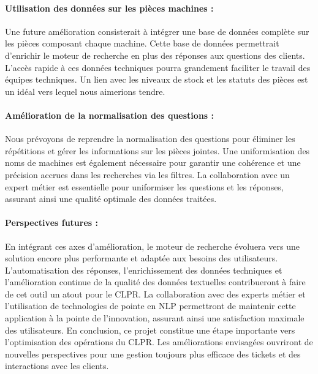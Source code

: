 \documentclass[12pt]{article}
\theoremstyle{definition}
\begin{document}
\paragraph{Utilisation des données sur les pièces machines : }
Une future amélioration consisterait à intégrer une base de données complète sur les pièces composant chaque machine. Cette base de données permettrait d'enrichir le moteur de recherche en plus des réponses aux questions des clients. L'accès rapide à ces données techniques pourra grandement faciliter le travail des équipes techniques. Un lien avec les niveaux de stock et les statuts des pièces est un idéal vers lequel nous aimerions tendre.

\paragraph{Amélioration de la normalisation des questions : }
Nous prévoyons de reprendre la normalisation des questions pour éliminer les répétitions et gérer les informations sur les pièces jointes. Une uniformisation des noms de machines est également nécessaire pour garantir une cohérence et une précision accrues dans les recherches via les filtres. La collaboration avec un expert métier est essentielle pour uniformiser les questions et les réponses, assurant ainsi une qualité optimale des données traitées.

\paragraph{Perspectives futures : }

En intégrant ces axes d'amélioration, le moteur de recherche évoluera vers une solution encore plus performante et adaptée aux besoins des utilisateurs. L'automatisation des réponses, l'enrichissement des données techniques et l'amélioration continue de la qualité des données textuelles contribueront à faire de cet outil un atout pour le CLPR. La collaboration avec des experts métier et l'utilisation de technologies de pointe en NLP permettront de maintenir cette application à la pointe de l'innovation, assurant ainsi une satisfaction maximale des utilisateurs. En conclusion, ce projet constitue une étape importante vers l'optimisation des opérations du CLPR. Les améliorations envisagées ouvriront de nouvelles perspectives pour une gestion toujours plus efficace des tickets et des interactions avec les clients.


\newpage
\end{document}
